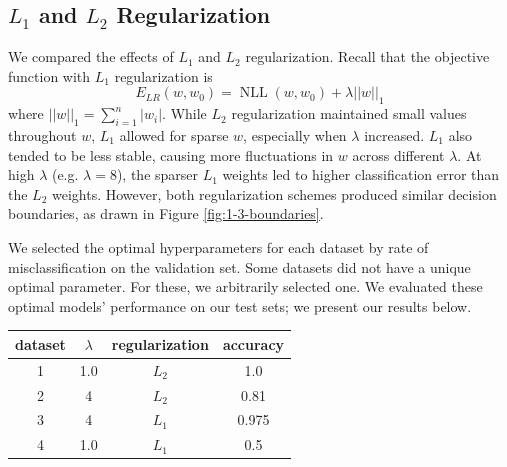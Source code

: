 \documentclass{article}
\DeclareMathOperator{\NLL}{NLL}
\begin{document}
\begin{multicols}{2}
\subsection{$L_1$ and $L_2$ Regularization}
We compared the effects of $L_1$ and $L_2$ regularization.
Recall that the objective function with $L_1$ regularization is
\begin{equation}
    E_{LR}(w, w_0) = \NLL(w, w_0) + \lambda ||w||_1
\end{equation}
where $||w||_1 = \sum_{i=1}^n{|w_i|}$. 
While $L_2$ regularization maintained small values throughout $w$, $L_1$ allowed for sparse $w$, especially when $\lambda$ increased. $L_1$ also tended to be less stable, causing more fluctuations in $w$ across different $\lambda$. At high $\lambda$ (e.g. $\lambda = 8$), the sparser $L_1$ weights led to higher classification error than the $L_2$ weights. However, both regularization schemes produced similar decision boundaries, as drawn in Figure \ref{fig:1-3-boundaries}.

We selected the optimal hyperparameters for each dataset
by rate of misclassification on the validation set.
Some datasets did not have a unique optimal parameter.
For these, we arbitrarily selected one.
We evaluated these optimal models' performance on our test sets;
we present our results below.
\begin{center}
\begin{tabular}{|c||c|c|c|}
\hline
dataset & $\lambda$	& regularization		 & accuracy \\\hline
        1	&  1.0 & $L_2$ & 1.0\\
        2	& 4 & $L_2$ & 0.81 \\
        3	& 4 & $L_1$ & 0.975 \\
        4	& 1.0 & $L_1$ & 0.5 \\\hline
\end{tabular}
\end{center}
%


\end{multicols}
\end{document}
